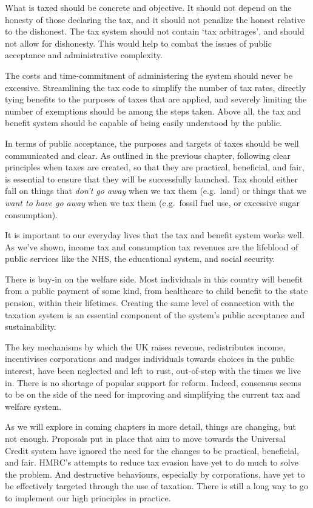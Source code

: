 \documentclass[]{tufte-handout}
\begin{document}
What is taxed should be concrete and objective. It should not depend on
the honesty of those declaring the tax, and it should not penalize the
honest relative to the dishonest. The tax system should not contain `tax
arbitrages', and should not allow for dishonesty. This would help to
combat the issues of public acceptance and administrative complexity.

The costs and time-commitment of administering the system should never
be excessive. Streamlining the tax code to simplify the number of tax
rates, directly tying benefits to the purposes of taxes that are
applied, and severely limiting the number of exemptions should be among
the steps taken. Above all, the tax and benefit system should be capable
of being easily understood by the public.

In terms of public acceptance, the purposes and targets of taxes should
be well communicated and clear. As outlined in the previous chapter,
following clear principles when taxes are created, so that they are
practical, beneficial, and fair, is essential to ensure that they will
be successfully launched. Tax should either fall on things that
\emph{don't go away} when we tax them (e.g.~land) or things that we
\emph{want to have go away} when we tax them (e.g.~fossil fuel use, or
excessive sugar consumption).

It is important to our everyday lives that the tax and benefit system
works well. As we've shown, income tax and consumption tax revenues are
the lifeblood of public services like the NHS, the educational system,
and social security.

There is buy-in on the welfare side. Most individuals in this country
will benefit from a public payment of some kind, from healthcare to
child benefit to the state pension, within their lifetimes. Creating the
same level of connection with the taxation system is an essential
component of the system's public acceptance and sustainability.

The key mechanisms by which the UK raises revenue, redistributes income,
incentivises corporations and nudges individuals towards choices in the
public interest, have been neglected and left to rust, out-of-step with
the times we live in. There is no shortage of popular support for
reform. Indeed, consensus seems to be on the side of the need for
improving and simplifying the current tax and welfare system.

As we will explore in coming chapters in more detail, things are
changing, but not enough. Proposals put in place that aim to move
towards the Universal Credit system have ignored the need for the
changes to be practical, beneficial, and fair. HMRC's attempts to reduce
tax evasion have yet to do much to solve the problem. And destructive
behaviours, especially by corporations, have yet to be effectively
targeted through the use of taxation. There is still a long way to go to
implement our high principles in practice.
\end{document}
